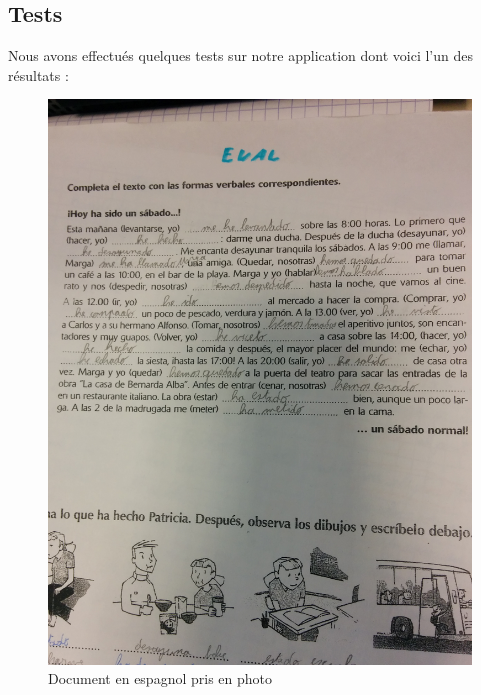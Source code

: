 \subsection{Tests}
Nous avons effectués quelques tests sur notre application dont voici l'un des résultats :
	\begin{figure}[H]
		\centering
		\includegraphics[scale=0.08]{images/testsImg.jpg}
		\caption{Document en espagnol pris en photo}
		\label{fig:image}
	\end{figure}
	
